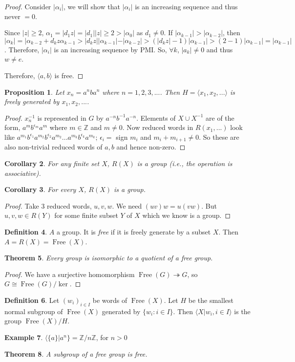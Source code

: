 \documentclass{amsart}
\newtheorem{thm}{Theorem}[section]
\newtheorem{prop}[thm]{Proposition}
\newtheorem{cor}[thm]{Corollary}
\theoremstyle{definition}
\newtheorem{definition}[thm]{Definition}
\newtheorem{example}[thm]{Example}
\newcommand{\Z}{\mathbb Z}
\DeclareMathOperator{\Free}{Free}
\begin{document}
\begin{proof}
Consider $|\alpha_i|$, we will show that $|\alpha_i|$ is an increasing sequence and thus never $=0$.

Since $|z|\geq 2$, $\alpha_1=|d_1z|=|d_1||z|\geq 2>|\alpha_0|$ as $d_1\not=0$.  If $|\alpha_{k-1}|>|\alpha_{k-2}|$, then $|\alpha_k|=|\alpha_{k-2}+d_kz\alpha_{k-1}>|d_kz||\alpha_{k-1}|-|\alpha_{k-2}|>(|d_kz|-1)|\alpha_{k-1}|>(2-1)|\alpha_{k-1}|=|\alpha_{k-1}|$. Therefore, $|\alpha_i|$ is an increasing sequence by PMI. So, $\forall k$, $|a_k|\not=0$ and thus $w\not=e$.

Therefore, $\langle a,b\rangle$ is free.
\end{proof}
\begin{prop}
	Let $x_n=a^nba^n$ where $n=1,2,3,...$. Then $H=\langle x_1,x_2,...\rangle$ is freely generated by $x_1, x_2,...$. 
\end{prop}
\begin{proof}
	$x_n^{-1}$ is represented in $G$ by $a^{-n}b^{-1}a^{-n}$. Elements of $X\cup X^{-1}$ are of the form, $a^mb^{\epsilon_m}a^m$ where $m\in\Z$ and $m\not=0$. Now reduced words in $R(x_1,...)$ look like $a^{m_1}b^{\epsilon_1}a^{m_2}b^{\epsilon_2}a^{m_2}...a^{m_k}b^{\epsilon_k}a^{m_k}$; $\epsilon_i=$ sign $m_i$ and $m_i+m_{i+1}\not=0$. So these are also non-trivial reduced words of $a,b$ and hence non-zero.
\end{proof}
\begin{cor}
For any finite set $X$, $R(X)$ is a group (i.e., the operation is associative).	
\end{cor}
\begin{cor}
For every $X$, $R(X)$ is a group.	
\end{cor}
\begin{proof}
	Take 3 reduced words, $u,v,w$. We need $(uv)w=u(vw)$. But $u,v,w\in R(Y)$ for some finite subset $Y$ of $X$ which we know is a group.
\end{proof}
\begin{definition}
	$A$ a group. It is \emph{free} if it is freely generate by a subset $X$. Then $A=R(X)=\Free(X)$.
\end{definition}
\begin{thm}
	Every group is isomorphic to a quotient of a free group.
\end{thm}
\begin{proof}
	We have a surjective homomorphism $\Free(G)\twoheadrightarrow G$, so $G\cong \Free(G)/\ker$.
\end{proof}
\begin{definition}
	Let $(w_i)_{i\in I}$ be words of $\Free(X)$. Let $H$ be the smallest normal subgroup of $\Free(X)$ generated by $\{w_i:i\in I\}$. Then $\langle X|w_i,i\in I\rangle$ is the group $\Free(X)/H$.
\end{definition}
\begin{example}
	$\langle \{a\}|a^n\}=\Z/n\Z$, for $n>0$
\end{example}
\begin{thm}
	A subgroup of a free group is free.
\end{thm}
\end{document}
